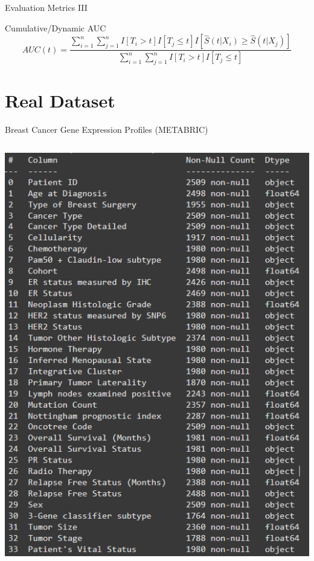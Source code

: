 \documentclass{beamer}
\begin{document}
\begin{frame}{Evaluation Metrics III}
\begin{block}{Cumulative/Dynamic AUC}
\begin{equation*}
    AUC(t) = \frac{\sum^n_{i=1} \sum^{n}_{j=1} I[T_i>t]I[T_j\leq t] I[\hat{S}(t|X_i) \geq \hat{S}(t|X_j)]}{\sum^n_{i=1} \sum^n_{j=1} I[T_i>t]I[T_j \leq t]}
\end{equation*}
\end{block}

\cite{UnoEtAl}
\end{frame}

\section{Real Dataset}

\begin{frame}{Breast Cancer Gene Expression Profiles (METABRIC)
}
\begin{columns}
    \begin{column}{0.49\textwidth}
        \centering
        \includegraphics[width=.95\textwidth]{images/eda1.png}

\end{column}
\end{columns}
\end{frame}
\end{document}

